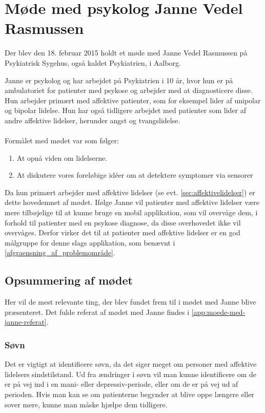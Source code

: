 \section{Møde med psykolog Janne Vedel Rasmussen}\label{sec:moede-med-psykolog}
Der blev den 18. februar 2015 holdt et møde med Janne Vedel Rasmussen på Psykiatrisk Sygehus, også kaldet Psykiatrien, i Aalborg.

Janne er psykolog og har arbejdet på Psykiatrien i 10 år, hvor hun er på ambulatoriet for patienter med psykose og arbejder med at diagnosticere disse. 
Hun arbejder primært med affektive patienter, som for eksempel lider af unipolar og bipolar lidelse.
Hun har også tidligere arbejdet med patienter som lider af andre affektive lidelser, herunder angst og tvangslidelse.

\paragraph{}
Formålet med mødet var som følger:

\begin{enumerate}
\item At opnå viden om lidelserne.
\item At diskutere vores foreløbige idéer om at detektere symptomer via sensorer
\end{enumerate}

Da hun primært arbejder med affektive lidelser (se evt. \cref{sec:affektivelidelser}) er dette hovedemnet af mødet.
Ifølge Janne vil patienter med affektive lidelser være mere tilbøjelige til at kunne bruge en mobil applikation, som vil overvåge dem, i forhold til patienter med en psykose diagnose, da disse overhovedet ikke vil overvåges.
Derfor virker det til at patienter med affektive lidelser er en god målgruppe for denne slags applikation, som benævnt i \cref{afgraensning_af_problemområde}.

\subsection{Opsummering af mødet}
Her vil de mest relevante ting, der blev fundet frem til i mødet med Janne blive præsenteret.
Det fulde referat af mødet med Janne findes i \cref{app:moede-med-janne-referat}.

\subsubsection{Søvn}
Det er vigtigt at identificere søvn, da det siger meget om personer med affektive lidelsers sindstilstand.
Ud fra ændringer i søvn vil man kunne identificere om de er på vej ind i en mani- eller depressiv-periode, eller om de er på vej ud af perioden. 
Hvis man kan se om patienterne begynder at blive oppe længere eller sover mere, kunne man måske hjælpe dem tidligere.

